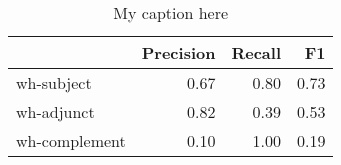 \begin{table}[!ht]
\centering
\begin{tabular}{lrrr}
\toprule
{} &  Precision &  Recall &   F1 \\
\midrule
wh-subject    &       0.67 &    0.80 & 0.73 \\
wh-adjunct    &       0.82 &    0.39 & 0.53 \\
wh-complement &       0.10 &    1.00 & 0.19 \\
\bottomrule
\end{tabular}
\caption{My caption here}
\label{tab:WH-ocd-combined-F1}
\end{table}